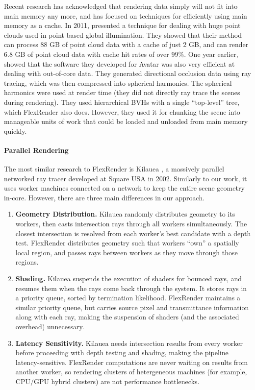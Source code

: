 \documentclass[a4paper,twoside]{article}
\begin{document}
Recent research has acknowledged that rendering data simply will not fit into
main memory any more, and has focused on techniques for efficiently using main
memory as a cache. In 2011, \cite{tabellion:2011} presented a technique for
dealing with huge point clouds used in point-based global illumination. They
showed that their method can process 88 GB of point cloud data with a cache of
just 2 GB, and can render 6.8 GB of point cloud data with cache hit rates of
over 99\%. One year earlier, \cite{pantaleoni:2010} showed that the software
they developed for Avatar was also very efficient at dealing with out-of-core
data. They generated directional occlusion data using ray tracing, which was then
compressed into spherical harmonics. The spherical harmonics were used at render
time (they did not directly ray trace the scenes during rendering). They used
hierarchical BVHs with a single ``top-level'' tree, which FlexRender also does.
However, they used it for chunking the scene into manageable units of work that
could be loaded and unloaded from main memory quickly.

\paragraph{Parallel Rendering}
The most similar research to FlexRender is Kilauea \cite{kato:2002}, a massively
parallel networked ray tracer developed at Square USA in 2002. Similarly to our
work, it uses worker machines connected on a network to keep the entire scene
geometry in-core. However, there are three main differences in our approach.

\begin{enumerate}
    \item \textbf{Geometry Distribution.}
        Kilauea randomly distributes geometry to its workers, then casts
        intersection rays through all workers simultaneously. The closest
        intersection is resolved from each worker's best candidate with a
        depth test. FlexRender distributes geometry such that workers ``own''
        a spatially local region, and passes rays between workers as they move
        through those regions.

    \item \textbf{Shading.}
        Kilauea suspends the execution of shaders for bounced rays, and resumes
        them when the rays come back through the system. It stores rays in a
        priority queue, sorted by termination likelihood. FlexRender maintains
        a similar priority queue, but carries source pixel and transmittance
        information along with each ray, making the suspension of shaders (and
        the associated overhead) unnecessary.

    \item \textbf{Latency Sensitivity.}
        Kilauea needs intersection results from every worker before proceeding
        with depth testing and shading, making the pipeline latency-sensitive.
        FlexRender computations are never waiting on results from another worker,
        so rendering clusters of hetergeneous machines (for example, CPU/GPU
        hybrid clusters) are not performance bottlenecks.
\end{enumerate}
\end{document}
